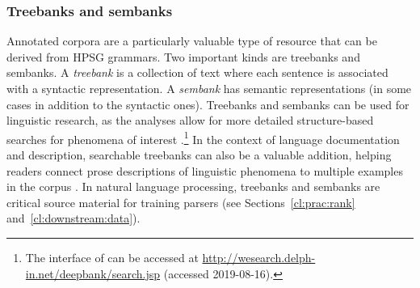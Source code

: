 \documentclass[output=paper
 	        ,biblatex
                ,babelshorthands
                ,newtxmath
                ,draftmode
                ,colorlinks, citecolor=brown
]{langscibook}
\begin{document}
\subsubsection{Treebanks and sembanks}
\label{cl:lang-doc:treebanks}

% 
Annotated corpora are a particularly valuable type of resource that
can be derived from HPSG grammars.  Two important kinds are treebanks and sembanks.  A
\textit{treebank} is a collection of text where each sentence is associated with a syntactic
representation.  A \textit{sembank} has semantic representations (in some cases in addition to the
syntactic ones). Treebanks and sembanks can be used for linguistic research, as the analyses allow
for more detailed structure-based searches for phenomena of
interest \citep{Rohde:05,Gho:Bir:10,Kou:Oep:14}.\footnote{The  interface of
  \citet{Kou:Oep:14} can be accessed at \url{http://wesearch.delph-in.net/deepbank/search.jsp}
  (accessed 2019-08-16).}  In the context of language documentation and description, searchable
treebanks can also be a valuable addition, helping readers connect prose
descriptions of linguistic phenomena to multiple examples in the corpus
\citep{Ben:Gho:Bal:Dri:12}. In natural language processing, treebanks and sembanks are critical
source material for training parsers (see Sections~\ref{cl:prac:rank} and~\ref{cl:downstream:data}).
\end{document}
